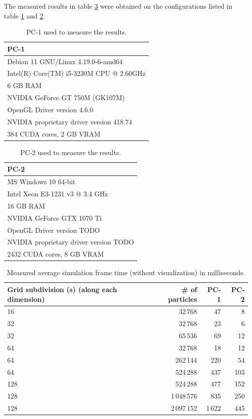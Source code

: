 \documentclass[a4paper,report]{IEEEtran}
\begin{document}
The measured results in table \ref{table:results} were obtained on the configurations listed in table \ref{table:pc1} and \ref{table:pc2}.
\begin{table}[!htbp]
	\begin{tabular}{l}
		\hline
		\textbf{PC-1} \\
		\hline
		Debian 11 GNU/Linux 4.19.0-6-amd64 \\
		Intel(R) Core(TM) i5-3230M CPU @ 2.60GHz \\
		6 GB RAM \\
		NVIDIA GeForce GT 750M (GK107M) \\
		OpenGL Driver version 4.6.0 \\
		NVIDIA proprietary driver version 418.74 \\
		384 CUDA cores, 2 GB VRAM \\
	\end{tabular}
	\caption{PC-1 used to measure the results.}
	\label{table:pc1}
\end{table}

\begin{table}[!htbp]
\begin{tabular}{l}
\hline
\textbf{PC-2} \\
\hline
	MS Windows 10 64-bit \\
	Intel Xeon E3-1231 v3 @ 3.4 GHz \\
	16 GB RAM \\
	NVIDIA GeForce GTX 1070 Ti \\
	OpenGL Driver version TODO \\
	NVIDIA proprietary driver version TODO \\
	2432 CUDA cores, 8 GB VRAM \\
\end{tabular}
	\caption{PC-2 used to measure the results.}
	\label{table:pc2}
\end{table}

\begin{table}
	\begin{tabularx}{1\linewidth}{X r r r}
\hline
		\textbf{Grid subdivision (s)} \newline (along each dimension) & \textbf{\# of particles} & \textbf{PC-1} & \textbf{PC-2} \\
\hline
	16  & 32\,768 & 47 & 8 \\
	32  & 32\,768 & 23 & 6 \\
	32  & 65\,536 & 69 & 12 \\
	64  & 32\,768 & 18 & 12 \\
	64  & 262\,144 & 220 & 54 \\
	64  & 524\,288 & 437 & 103 \\
	128 & 524\,288 & 477 & 152 \\
	128 & 1\,048\,576 & 835 & 250 \\
	128 & 2\,097\,152 & 1\,622 & 445 \\
\hline
\end{tabularx}
	\caption{Measured average simulation frame time (without visualization) in milliseconds.}
	\label{table:results}
\end{table}
\end{document}
